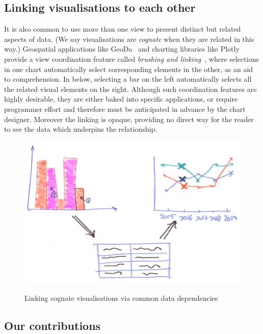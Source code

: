 \subsection{Linking visualisations to each other}

It is also common to use more than one view to present distinct but related aspects of data. (We say visualisations are \emph{cognate} when they are related in this way.) Geospatial applications like GeoDa~\cite{anselin06} and charting libraries like Plotly provide a view coordination feature called \emph{brushing and linking}~\cite{becker87}, where selections in one chart automatically select corresponding elements in the other, as an aid to comprehension. In  below, selecting a bar on the left automatically selects all the related visual elements on the right. Although such coordination features are highly desirable, they are either baked into specific applications, or require programmer effort and therefore must be anticipated in advance by the chart designer. Moreover the linking is opaque, providing no direct way for the reader to see the data which underpins the relationship.

\begin{figure}[H]
   {\includegraphics[scale=0.14]{fig/example/vis-linking.png}}
   \caption{Linking cognate visualisations via common data dependencies}
   \label{fig:introduction:vis-linking}
\end{figure}

\subsection{Our contributions}


